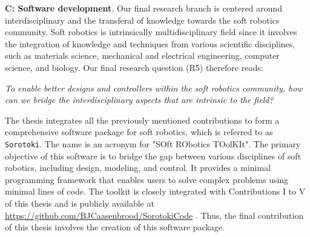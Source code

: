 
\textbf{C: Software development}. Our final research branch is centered around interdisciplinary and the transferal of knowledge towards the soft robotics community. Soft robotics is intrinsically multidisciplinary field since it involves the integration of knowledge and techniques from various scientific disciplines, such as materials science, mechanical and electrical engineering, computer science, and biology. Our final research question (R5) therefore reads:

\begin{center}
\textit{To enable better designs and controllers within the soft robotics community, how can we bridge the interdisciplinary aspects that are intrinsic to the field?}
\end{center}

The thesis integrates all the previously mentioned contributions to form a comprehensive software package for soft robotics, which is referred to as \texttt{Sorotoki}. The name is an acronym for "SOft RObotics TOolKIt". The primary objective of this software is to bridge the gap between various disciplines of soft robotics, including design, modeling, and control. It provides a minimal programming framework that enables users to solve complex problems using minimal lines of code. The toolkit is closely integrated with Contributions I to V of this thesis and is publicly available at \url{https://github.com/BJCaasenbrood/SorotokiCode} \cite{SorotokiCode}. Thus, the final contribution of this thesis involves the creation of this software package.
 \vspace{2mm}

